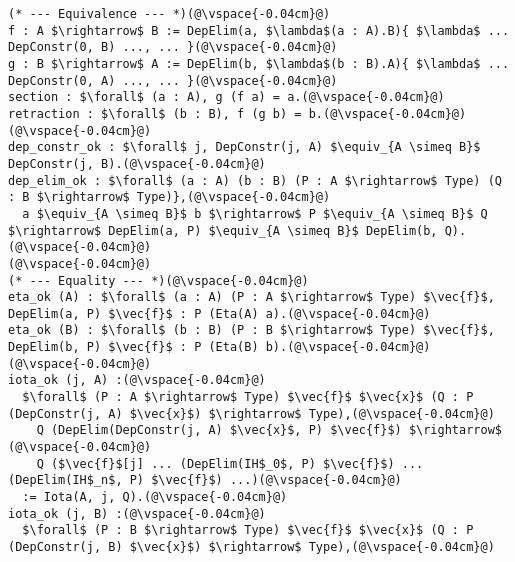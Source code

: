 \begin{figure*}
\begin{lstlisting}
(* --- Equivalence --- *)(@\vspace{-0.04cm}@)
f : A $\rightarrow$ B := DepElim(a, $\lambda$(a : A).B){ $\lambda$ ... DepConstr(0, B) ..., ... }(@\vspace{-0.04cm}@)
g : B $\rightarrow$ A := DepElim(b, $\lambda$(b : B).A){ $\lambda$ ... DepConstr(0, A) ..., ... }(@\vspace{-0.04cm}@)
section : $\forall$ (a : A), g (f a) = a.(@\vspace{-0.04cm}@)
retraction : $\forall$ (b : B), f (g b) = b.(@\vspace{-0.04cm}@)
(@\vspace{-0.04cm}@)
dep_constr_ok : $\forall$ j, DepConstr(j, A) $\equiv_{A \simeq B}$ DepConstr(j, B).(@\vspace{-0.04cm}@)
dep_elim_ok : $\forall$ (a : A) (b : B) (P : A $\rightarrow$ Type) (Q : B $\rightarrow$ Type)},(@\vspace{-0.04cm}@)
  a $\equiv_{A \simeq B}$ b $\rightarrow$ P $\equiv_{A \simeq B}$ Q $\rightarrow$ DepElim(a, P) $\equiv_{A \simeq B}$ DepElim(b, Q).(@\vspace{-0.04cm}@)
(@\vspace{-0.04cm}@)
(* --- Equality --- *)(@\vspace{-0.04cm}@)
eta_ok (A) : $\forall$ (a : A) (P : A $\rightarrow$ Type) $\vec{f}$, DepElim(a, P) $\vec{f}$ : P (Eta(A) a).(@\vspace{-0.04cm}@)
eta_ok (B) : $\forall$ (b : B) (P : B $\rightarrow$ Type) $\vec{f}$, DepElim(b, P) $\vec{f}$ : P (Eta(B) b).(@\vspace{-0.04cm}@)
(@\vspace{-0.04cm}@)
iota_ok (j, A) :(@\vspace{-0.04cm}@)
  $\forall$ (P : A $\rightarrow$ Type) $\vec{f}$ $\vec{x}$ (Q : P (DepConstr(j, A) $\vec{x}$) $\rightarrow$ Type),(@\vspace{-0.04cm}@)
    Q (DepElim(DepConstr(j, A) $\vec{x}$, P) $\vec{f}$) $\rightarrow$ (@\vspace{-0.04cm}@)
    Q ($\vec{f}$[j] ... (DepElim(IH$_0$, P) $\vec{f}$) ... (DepElim(IH$_n$, P) $\vec{f}$) ...)(@\vspace{-0.04cm}@)
  := Iota(A, j, Q).(@\vspace{-0.04cm}@)
iota_ok (j, B) :(@\vspace{-0.04cm}@)
  $\forall$ (P : B $\rightarrow$ Type) $\vec{f}$ $\vec{x}$ (Q : P (DepConstr(j, B) $\vec{x}$) $\rightarrow$ Type),(@\vspace{-0.04cm}@)

\end{lstlisting}
\end{figure*}
